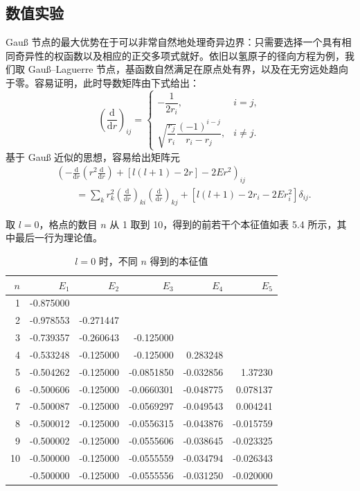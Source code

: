 \subsection{数值实验}

Gauß 节点的最大优势在于可以非常自然地处理奇异边界：只需要选择一个具有相同奇异性的权函数以及相应的正交多项式就好。依旧以氢原子的径向方程为例，我们取 Gauß--Laguerre 节点，基函数自然满足在原点处有界，以及在无穷远处趋向于零。容易证明，此时导数矩阵由下式给出：
\begin{equation}
\left(\frac{\mathrm d}{\mathrm dr}\right)_{ij}=
\begin{cases}
-\dfrac1{2r_i},&i=j,\\[6pt]
\sqrt{\dfrac{r_j}{r_i}}\dfrac{(-1)^{i-j}}{r_i-r_j},&i\ne j.
\end{cases}
\tag{5.4.51}
\end{equation}
基于 Gauß 近似的思想，容易给出矩阵元
\begin{equation}
\begin{aligned}
&\left(-\frac{\mathrm d}{\mathrm dr}\left(r^2\frac{\mathrm d}{\mathrm dr}\right)+[l(l+1)-2r]-2Er^2\right)_{ij}\\
&\qquad=\sum_k r_k^2\left(\frac{\mathrm d}{\mathrm dr}\right)_{ki}
\left(\frac{\mathrm d}{\mathrm dr}\right)_{kj}
+[l(l+1)-2r_i-2Er_i^2]\delta_{ij}.
\end{aligned}
\tag{5.4.52}
\end{equation}

取 $l=0$，格点的数目 $n$ 从 1 取到 10，得到的前若干个本征值如表 5.4 所示，其中最后一行为理论值。

\begin{table}[htbp]
\centering
\caption{$l=0$ 时，不同 $n$ 得到的本征值}
\begin{tabular}{@{}rrrrrr@{}}
\toprule
$n$&$E_1$&$E_2$&$E_3$&$E_4$&$E_5$\\
\midrule
1&-0.875000&&&&\\
2&-0.978553&-0.271447&&&\\
3&-0.739357&-0.260643&-0.125000&&\\
4&-0.533248&-0.125000&-0.125000&0.283248&\\
5&-0.504262&-0.125000&-0.0851850&-0.032856&1.37230\\
6&-0.500606&-0.125000&-0.0660301&-0.048775&0.078137\\
7&-0.500087&-0.125000&-0.0569297&-0.049543&0.004241\\
8&-0.500012&-0.125000&-0.0556315&-0.043876&-0.015759\\
9&-0.500002&-0.125000&-0.0555606&-0.038645&-0.023325\\
10&-0.500000&-0.125000&-0.0555559&-0.034794&-0.026343\\
\midrule
&-0.500000&-0.125000&-0.0555556&-0.031250&-0.020000\\
\bottomrule
\end{tabular}
\end{table}

